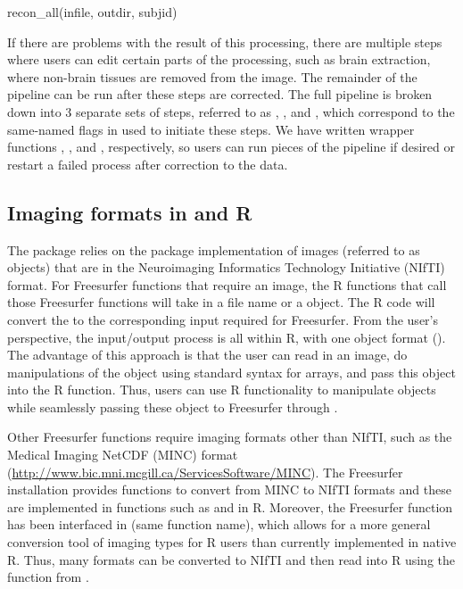 \begin{Schunk}
\begin{Sinput}
recon_all(infile, outdir, subjid)
\end{Sinput}
\end{Schunk}

If there are problems with the result of this processing, there are
multiple steps where users can edit certain parts of the processing,
such as brain extraction, where non-brain tissues are removed from the
image. The remainder of the pipeline can be run after these steps are
corrected. The full pipeline is broken down into 3 separate sets of
steps, referred to as , , and
, which correspond to the same-named flags in
 used to initiate these steps. We have written wrapper
functions , , and ,
respectively, so users can run pieces of the pipeline if desired or
restart a failed process after correction to the data.

\subsection{\texorpdfstring{Imaging formats in  and
R}{Imaging formats in  and R}}\label{imaging-formats-in-and-r}

The  package relies on the 
\citep{whitcher_working_2011} package implementation of images (referred
to as  objects) that are in the Neuroimaging Informatics
Technology Initiative (NIfTI) format. For Freesurfer functions that
require an image, the R  functions that call those
Freesurfer functions will take in a file name or a  object.
The R code will convert the  to the corresponding input
required for Freesurfer. From the user's perspective, the input/output
process is all within R, with one object format (). The
advantage of this approach is that the user can read in an image, do
manipulations of the  object using standard syntax for
arrays, and pass this object into the  R function. Thus,
users can use R functionality to manipulate objects while seamlessly
passing these object to Freesurfer through .

Other Freesurfer functions require imaging formats other than NIfTI,
such as the Medical Imaging NetCDF (MINC) format
(\url{http://www.bic.mni.mcgill.ca/ServicesSoftware/MINC}). The
Freesurfer installation provides functions to convert from MINC to NIfTI
formats and these are implemented in functions such as 
and  in R. Moreover, the  Freesurfer
function has been interfaced in  (same function name),
which allows for a more general conversion tool of imaging types for R
users than currently implemented in native R. Thus, many formats can be
converted to NIfTI and then read into R using the 
function from .

